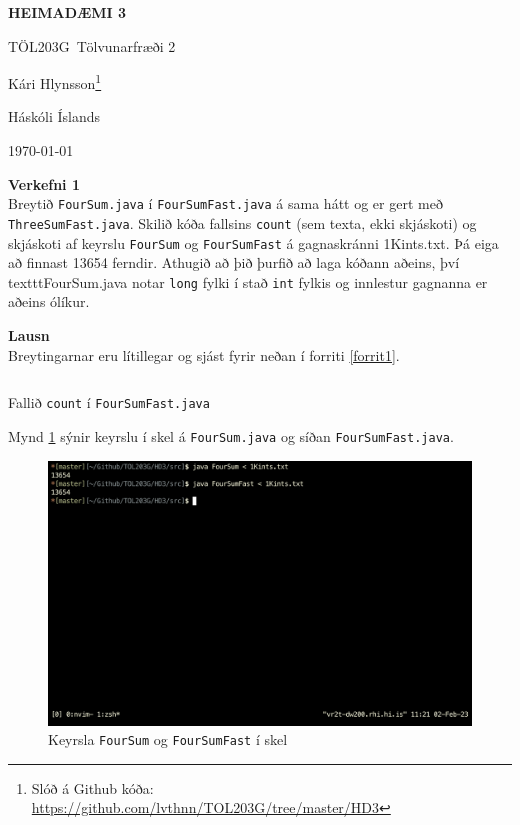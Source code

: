 \documentclass[12pt, a4paper, hidelinks]{article}
\title{}
\newcommand{\doctitle}{\uppercase{Heimadæmi 3}}
\newcommand{\coursename}{Tölvunarfræði 2}
\newcommand{\coursenum}{TÖL203G}
\begin{document}
\thispagestyle{plain}
\centerline{\bfseries\Large\doctitle}
\medskip
\centerline{\large\coursenum\ \coursename}
\bigskip

\centerline{\large Kári Hlynsson\footnote{Slóð á Github kóða: \url{https://github.com/lvthnn/TOL203G/tree/master/HD3}}}
\bigskip
\centerline{Háskóli Íslands}
\medskip
\centerline{\today}

\bigskip

\noindent
\textbf{\large Verkefni 1} \medskip \\
Breytið \texttt{FourSum.java} í \texttt{FourSumFast.java} á sama hátt og er
gert með \texttt{ThreeSumFast.java}. Skilið kóða fallsins \texttt{count}
(sem texta, ekki skjáskoti) og skjáskoti af keyrslu \texttt{FourSum} og
\texttt{FourSumFast} á gagnaskránni 1Kints.txt. Þá eiga að finnast 13654
ferndir. Athugið að þið þurfið að laga kóðann aðeins, því texttt{FourSum.java}
notar \texttt{long} fylki í stað \texttt{int} fylkis og innlestur gagnanna er aðeins ólíkur.

\medskip
\noindent
\textbf{\large Lausn} \medskip \\
Breytingarnar eru lítillegar og sjást fyrir neðan í forriti \ref{forrit1}.

\begin{listing}[ht!]
    \centering
    \inputminted[firstline=49, lastline=64, linenos]{java}{../src/V1/FourSumFast.java}
    \caption{Fallið \texttt{count} í \texttt{FourSumFast.java}}
    \label{forrit1}
\end{listing}

\noindent
Mynd \ref{mynd1} sýnir keyrslu í skel á \texttt{FourSum.java} og síðan \texttt{FourSumFast.java}.

\newpage
\begin{figure}[ht!]
   \centering
   \includegraphics[width=\textwidth]{img/foursum_keyrsla.png} 
   \caption{Keyrsla \texttt{FourSum} og \texttt{FourSumFast} í skel}
   \label{mynd1}
\end{figure}
\end{document}
